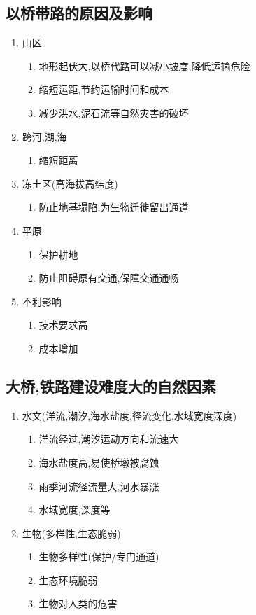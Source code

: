 \documentclass[a4paper]{article}
\begin{document}
    \subsection{以桥带路的原因及影响}
    \begin{enumerate}
        \item 山区
        \begin{enumerate}
            \item 地形起伏大,以桥代路可以减小坡度,降低运输危险 %
            \item 缩短运距,节约运输时间和成本
            \item 减少洪水,泥石流等自然灾害的破坏
        \end{enumerate}
        \item 跨河,湖,海
        \begin{enumerate}
            \item 缩短距离 %
        \end{enumerate}
        \item 冻土区(高海拔高纬度)
        \begin{enumerate}
            \item 防止地基塌陷;为生物迁徙留出通道
        \end{enumerate}
        \item 平原
        \begin{enumerate}
            \item 保护耕地
            \item 防止阻碍原有交通,保障交通通畅
        \end{enumerate}
        \item 不利影响
        \begin{enumerate}
            \item 技术要求高
            \item 成本增加
        \end{enumerate}
    \end{enumerate}
    \subsection{大桥,铁路建设难度大的自然因素}
    \begin{enumerate}
        \item 水文(洋流,潮汐,海水盐度,径流变化,水域宽度深度)
        \begin{enumerate}
            \item 洋流经过,潮汐运动方向和流速大
            \item 海水盐度高,易使桥墩被腐蚀
            \item 雨季河流径流量大,河水暴涨
            \item 水域宽度,深度等
        \end{enumerate}
        \item 生物(多样性,生态脆弱)
        \begin{enumerate}
            \item 生物多样性(保护/专门通道)
            \item 生态环境脆弱
            \item 生物对人类的危害
        \end{enumerate}
    \end{enumerate}
\end{document}
